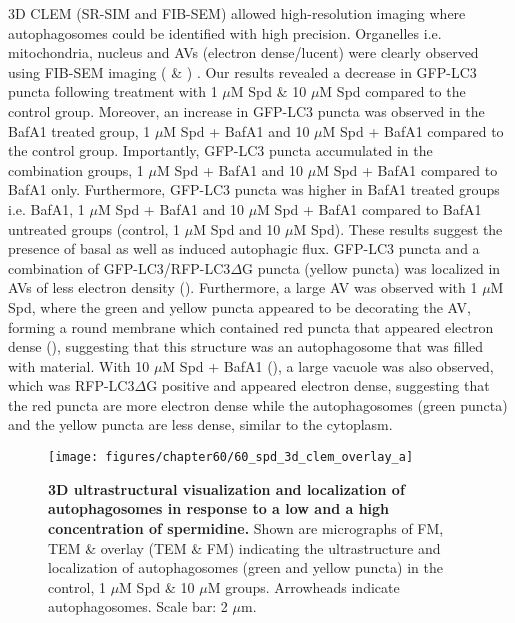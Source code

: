 3D CLEM (SR-SIM and FIB-SEM) allowed high-resolution imaging where autophagosomes could be identified with high precision. Organelles i.e. mitochondria, nucleus and AVs (electron dense/lucent) were clearly observed using FIB-SEM imaging ( \& ) . Our results revealed a decrease in GFP-LC3 puncta following treatment with 1 $\mu$M Spd \& 10 $\mu$M Spd compared to the control group. Moreover, an increase in GFP-LC3 puncta was observed in the BafA1 treated group, 1 $\mu$M Spd + BafA1 and 10 $\mu$M Spd + BafA1 compared to the control group. Importantly, GFP-LC3 puncta accumulated in the combination groups, 1 $\mu$M Spd + BafA1 and 10 $\mu$M Spd + BafA1 compared to BafA1 only. Furthermore, GFP-LC3 puncta was higher in BafA1 treated groups i.e. BafA1, 1 $\mu$M Spd + BafA1 and 10 $\mu$M Spd + BafA1 compared to BafA1 untreated groups (control, 1 $\mu$M Spd and 10 $\mu$M Spd). These results suggest the presence of basal as well as induced autophagic flux. GFP-LC3 puncta and a combination of GFP-LC3/RFP-LC3$\Delta$G puncta (yellow puncta) was localized in AVs of less electron density (). Furthermore, a large AV was observed with 1 $\mu$M Spd, where the green and yellow puncta appeared to be decorating the AV, forming a round membrane which contained red puncta that appeared electron dense (), suggesting that this structure was an autophagosome that was filled with material. With 10 $\mu$M Spd + BafA1 (), a large vacuole was also observed, which was RFP-LC3$\Delta$G positive and appeared electron dense, suggesting that the red puncta are more electron dense while the autophagosomes (green puncta) and the yellow puncta are less dense, similar to the cytoplasm. 

\begin{landscape}
\begin{figure}[!htbp]
\center
 \texttt{[image: figures/chapter60/60\_spd\_3d\_clem\_overlay\_a]}
 \caption[3D ultrastructural visualization and localization of autophagosomes in response to a low and a high concentration of spermidine]{\textbf{3D ultrastructural visualization and localization of autophagosomes in response to a low and a high concentration of spermidine.} Shown are micrographs of FM, TEM \& overlay (TEM \& FM) indicating the ultrastructure and localization of autophagosomes (green and yellow puncta) in the control, 1 $\mu$M Spd \& 10 $\mu$M groups. Arrowheads indicate autophagosomes. Scale bar: 2 $\mu$m.}
 \label{fig:60_spd_3d_clem_overlay_a}
\end{figure} 
\end{landscape}


